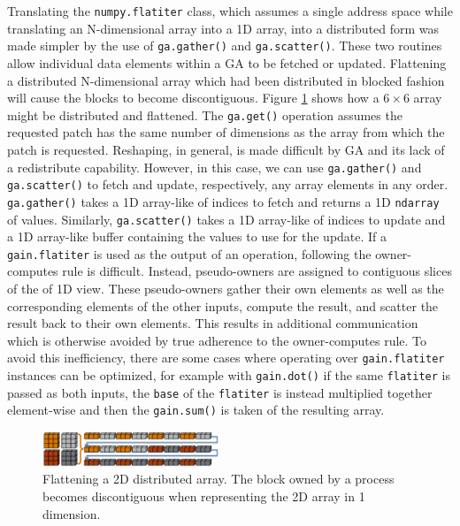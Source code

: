\documentclass{sigplanconf}
\begin{document}
Translating the \verb=numpy.flatiter= class, which assumes a single address
space while translating an N-dimensional array into a 1D array, into a
distributed form was made simpler by the use of \verb=ga.gather()= and
\verb=ga.scatter()=. These two routines allow individual data elements within
a GA to be fetched or updated.  Flattening a distributed N-dimensional array
which had been distributed in blocked fashion will cause the blocks to become
discontiguous. Figure \ref{fig:flatten} shows how a $6 \times 6$ array
might be distributed and flattened.  The \verb=ga.get()= operation assumes the
requested patch has the same number of dimensions as the array from which the
patch is requested. Reshaping, in general, is made difficult by GA and its
lack of a redistribute capability.  However, in this case, we can use
\verb=ga.gather()= and \verb=ga.scatter()= to fetch and update, respectively,
any array elements in any order.  \verb=ga.gather()= takes a 1D array-like of
indices to fetch and returns a 1D \verb=ndarray= of values. Similarly,
\verb=ga.scatter()= takes a 1D array-like of indices to update and a 1D
array-like buffer containing the values to use for the update. If a
\verb=gain.flatiter= is used as the output of an operation, following the
owner-computes rule is difficult. Instead, pseudo-owners are assigned to
contiguous slices of the of 1D view. These pseudo-owners gather their own
elements as well as the corresponding elements of the other inputs, compute
the result, and scatter the result back to their own elements. This results in
additional communication which is otherwise avoided by true adherence to the
owner-computes rule. To avoid this inefficiency, there are some cases where
operating over \verb=gain.flatiter= instances can be optimized, for example
with \verb=gain.dot()= if the same \verb=flatiter= is passed as both inputs,
the \verb=base= of the \verb=flatiter= is instead multiplied together
element-wise and then the \verb=gain.sum()= is taken of the resulting array.

\begin{figure}[htb]
\centering
\includegraphics[width=0.47\textwidth]{image6_crop.eps}
\caption{
Flattening a 2D distributed array. The block owned by a process becomes
discontiguous when representing the 2D array in 1 dimension.
}
\label{fig:flatten}
\end{figure}
\end{document}
